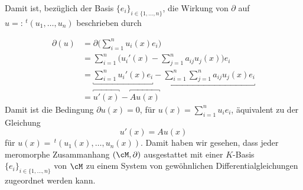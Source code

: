 Damit ist, bezüglich der Basis $\{e_i\}_{i\in\{1,\dots,n\}}$, die Wirkung von
$\partial$ auf $u=:\,^t(u_1,\dots,u_n)$ beschrieben durch
\iffalse
  \[
  \partial(u) = \partial \Big( \sum_{i=1}^nu_i(x)e_i \Big)
  =\sum_{i=1}^n \Big( u_i'(x)-\sum_{j=1}^na_{ij}u_j(x) \Big)e_i \,.
  \]
\fi
\begin{align*}
\partial(u) &= \partial \Big( \sum_{i=1}^nu_i(x)e_i \Big)
\\&=\sum_{i=1}^n \Big( u_i'(x)-\sum_{j=1}^na_{ij}u_j(x) \Big)e_i
\\&=\underbracket{\sum_{i=1}^n u_i'(x)e_i} 
  - \underbracket{\sum_{i=1}^n\sum_{j=1}^na_{ij}u_j(x)e_i}
\\&=\overbracket{u'(x)} 
  - \overbracket{Au(x)}
\end{align*}
Damit ist die Bedingung $\partial u(x)=0$, für $u(x)= \sum_{i=1}^n u_ie_i$,
äquivalent zu der Gleichung
\begin{equation*}
u'(x)=Au(x)
\end{equation*}
für $u(x)=\,^t(u_1(x),\dots,u_n(x))$. Damit haben wir gesehen,
dass jeder meromorphe Zusammanhang $(\cM,\partial)$ ausgestattet mit einer
$K$-Basis $\{e_i\}_{i\in\{1,\dots,n\}}$ von $\cM$ zu einem System von
gewöhnlichen Differentialgleichungen zugeordnet werden kann.

\begin{comment}
\begin{prop}[Transformationsformel] \cite[Chap 5.1.1]{hotta2007d}
In der Situation
\begin{center}
\begin{tikzpicture} [scale=3.3, descr/.style={fill=white,inner sep=2.5pt} ]
\matrix (m) [
  matrix of math nodes
  , row sep=3em
  , column sep=3em
]
{
  K^r &   &   & K^r \\
      & M & M & \\
  K^r &   &   & K^r \\
};
\path[->,font=\scriptsize,>=angle 90]
(m-1-1) edge node[descr]{$\cong$} node[above]{$\phi$} (m-2-2)
(m-3-1) edge node[descr]{$\cong$} node[above]{$\psi$} (m-2-2)
(m-1-4) edge node[descr]{$\cong$} node[above]{$\phi$} (m-2-3)
(m-3-4) edge node[descr]{$\cong$} node[above]{$\psi$} (m-2-3)

(m-2-2) edge node[above]{$\partial$} (m-2-3)

(m-1-1) edge node[above]{$\frac{d}{dz}+A$} (m-1-4)
(m-3-1) edge node[above]{$\frac{d}{dz}+B$} (m-3-4)

(m-3-1) edge node[descr]{$\cong$} node[right]{$T$} (m-1-1)
(m-3-4) edge node[descr]{$\cong$} node[left]{$T$} (m-1-4)
;

\path[>=stealth,|->]
;
\end{tikzpicture}
\end{center}
mit $\phi,\psi$ und $T$ $K$-Linear und $\partial,(\frac{d}{dx}+A)$ und
$(\frac{d}{dx}+B)$ $\C$-Linear, gilt:\\
Der meromorphe Zusammenhang. $\frac{d}{dx}+A$ auf $K^r$ wird durch
Basiswechsel
$T\in GL(r,K)$ zu
\[
\frac{d}{dx}+(T^{-1}\cdot T'+T^{-1}AT) = \frac{d}{dx}+B
\]
\end{prop}
\end{comment}

